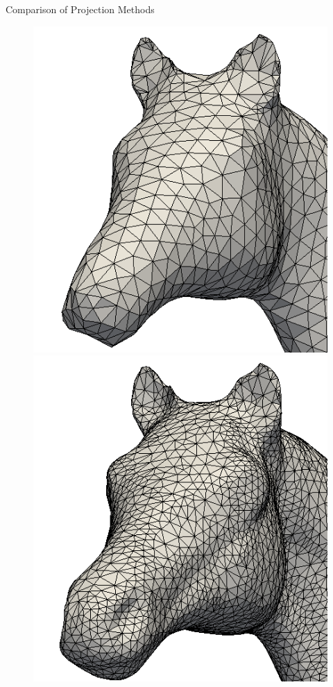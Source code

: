 \documentclass{beamer}
\begin{document}
\begin{frame}[plain]{Comparison of Projection Methods}

  \begin{figure}
    \begin{minipage}{0.32\textwidth}
      \centering
      \includegraphics[width=1\linewidth]{../image/horse_mouth_2.png}
    \end{minipage}
    \begin{minipage}{.32\textwidth}
      \centering
      \includegraphics[width=1\linewidth]{../image/horse_mouth_0.png}

\end{minipage}
\end{figure}
\end{frame}
\end{document}
